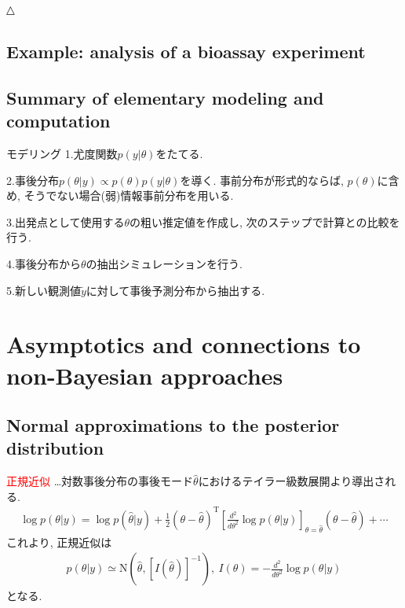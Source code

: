 \documentclass[11pt,a4pape,dvipdfmx]{jarticle}
\newcommand{\eqn}[1]{\begin{align*}#1\end{align*}}
\newcommand{\tcr}[1]{\textcolor{red}{#1}}
\begin{document}
△


\subsection{Example: analysis of a bioassay experiment}




\subsection{Summary of elementary modeling and computation}

\begin{itembox}[l]{モデリング}
1.尤度関数$p(y|\theta)$をたてる.

2.事後分布$p(\theta|y)\propto p(\theta)p(y|\theta)$を導く.
事前分布が形式的ならば, $p(\theta)$に含め, そうでない場合(弱)情報事前分布を用いる.

3.出発点として使用する$\theta$の粗い推定値を作成し, 次のステップで計算との比較を行う.

4.事後分布から$\theta$の抽出シミュレーションを行う.

5.新しい観測値$\tilde{y}$に対して事後予測分布から抽出する.
\end{itembox}



\section{Asymptotics and connections to non-Bayesian approaches}

\subsection{Normal approximations to the posterior distribution}
\begin{itembox}[l]{\tcr{正規近似}}
…対数事後分布の事後モード$\hat{\theta}$におけるテイラー級数展開より導出される.
\eqn{\log p(\theta|y)=\log p (\hat{\theta}|y)+\tfrac{1}{2}(\theta-\hat{\theta})^{\mathrm{T}}\left[ \tfrac{d^2}{d\theta^2} \log p(\theta|y)\right]_{\theta=\hat{\theta}}(\theta-\hat{\theta})+\cdots}
これより, 正規近似は
\eqn{p(\theta|y)\simeq \text{N}(\hat{\theta},[I(\hat{\theta})]^{-1}),\ I(\theta)=-\tfrac{d^2}{d\theta^2}\log p(\theta|y)}
となる.
\end{itembox}
\end{document}
